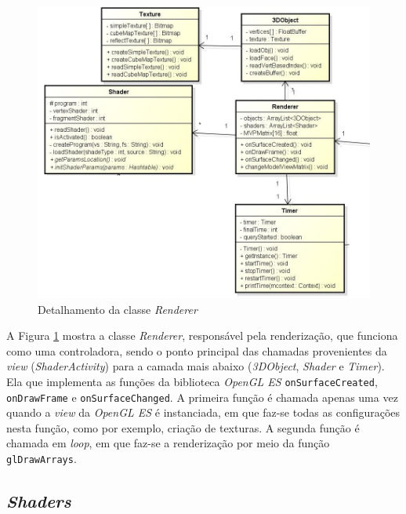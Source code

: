 	\begin{figure}[ht]
	\centering
		\includegraphics[keepaspectratio=true,scale=0.6]{figuras/renderer.jpg}
	\caption{Detalhamento da classe \textit{Renderer}}
	\label{renderer}
	\end{figure}

	A Figura \ref{renderer} mostra a classe \textit{Renderer}, responsável pela renderização, que funciona como uma controladora, sendo o ponto principal  das chamadas provenientes da \textit{view} (\textit{ShaderActivity}) para a camada mais abaixo (\textit{3DObject}, \textit{Shader} e \textit{Timer}). Ela que implementa as funções da biblioteca \textit{OpenGL ES} \texttt{onSurfaceCreated},  \texttt{onDrawFrame} e \texttt{onSurfaceChanged}. A primeira função é chamada apenas uma vez quando a \textit{view} da \textit{OpenGL ES} é instanciada, em que faz-se todas as configurações nesta função, como por exemplo, criação de texturas. A segunda função é chamada em \textit{loop}, em que faz-se a renderização por meio da função \texttt{glDrawArrays}. 

\subsection{\textit{Shaders}}      


